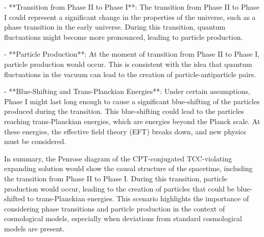 - **Transition from Phase II to Phase I**: The transition from Phase II to Phase I could represent a significant change in the properties of the universe, such as a phase transition in the early universe. During this transition, quantum fluctuations might become more pronounced, leading to particle production.

- **Particle Production**: At the moment of transition from Phase II to Phase I, particle production would occur. This is consistent with the idea that quantum fluctuations in the vacuum can lead to the creation of particle-antiparticle pairs.

- **Blue-Shifting and Trans-Planckian Energies**: Under certain assumptions, Phase I might last long enough to cause a significant blue-shifting of the particles produced during the transition. This blue-shifting could lead to the particles reaching trans-Planckian energies, which are energies beyond the Planck scale. At these energies, the effective field theory (EFT) breaks down, and new physics must be considered.

In summary, the Penrose diagram of the CPT-conjugated TCC-violating expanding solution would show the causal structure of the spacetime, including the transition from Phase II to Phase I. During this transition, particle production would occur, leading to the creation of particles that could be blue-shifted to trans-Planckian energies. This scenario highlights the importance of considering phase transitions and particle production in the context of cosmological models, especially when deviations from standard cosmological models are present.